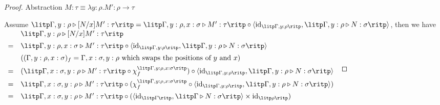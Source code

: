 \begin{proof}
Abstraction $ M: \tau \equiv \lambda y: \rho . M' : \rho \to \tau $

Assume $ \litp \Gamma , y: \rho \triangleright [N/x]M': \tau \ritp = \litp \Gamma , y: \rho , x: \sigma \triangleright M': \tau \ritp \circ \langle \text{id}_{\litp \Gamma , y: \rho \ritp} , \litp \Gamma , y: \rho \triangleright N: \sigma \ritp \rangle $, then we have \\[5pt]
$
\begin{array}{rl}
   & \litp \Gamma , y: \rho \triangleright [N/x]M': \tau \ritp \\[5pt]
 = & \litp \Gamma , y: \rho , x: \sigma \triangleright M': \tau \ritp \circ \langle \text{id}_{\litp \Gamma , y: \rho \ritp} , \litp \Gamma , y: \rho \triangleright N: \sigma \ritp \rangle \\[5pt]
   & ((\Gamma , y: \rho , x: \sigma )_f = \Gamma , x: \sigma , y: \rho \text{ which swaps the positions of } y \text{ and } x) \\[5pt]
 = & (\litp \Gamma , x: \sigma , y: \rho \triangleright M': \tau \ritp \circ \chi_f^{\litp \Gamma , y: \rho , x: \sigma \ritp}) \circ \langle \text{id}_{\litp \Gamma , y: \rho \ritp} , \litp \Gamma , y: \rho \triangleright N: \sigma \ritp \rangle \\[5pt]
 = & \litp \Gamma , x: \sigma , y: \rho \triangleright M': \tau \ritp \circ ( \chi_f^{\litp \Gamma , y: \rho , x: \sigma \ritp} \circ \langle \text{id}_{\litp \Gamma , y: \rho \ritp} , \litp \Gamma , y: \rho \triangleright N: \sigma \ritp \rangle ) \\[5pt]
 = & \litp \Gamma , x: \sigma , y: \rho \triangleright M': \tau \ritp \circ ( \langle \text{id}_{\litp \Gamma \ritp} , \litp \Gamma \triangleright N: \sigma \ritp \rangle \times \text{id}_{\litp \rho \ritp} ) \\[10pt]
\end{array}
$


\end{proof}
